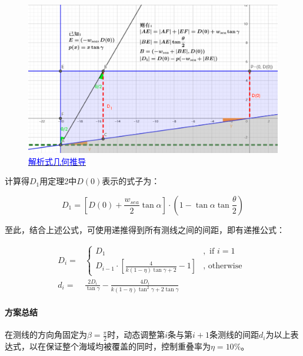 \begin{figure}[h]
    \centering
    \includegraphics[scale=0.3]{res/img/解析式几何推导.png}
    \caption{\href{https://www.geogebra.org/m/ycxg4tw9}{\textcolor{blue}{解析式几何推导}}}
    \label{fig:解析式几何推导}
\end{figure}

计算得$D_1$用定理2中$D(0)$表示的式子为：

\begin{equation}
    D_1 = \left[ D(0) + \frac{w_{sea}}{2} \tan \alpha \right] \cdot \left( 1 - \tan \alpha \tan \frac{\theta}{2} \right)
\end{equation}

至此，结合上述公式，可使用递推得到所有测线之间的间距，即有递推公式：

\begin{align}
    D_{i} = & \begin{cases}
                  D_1                                                                    &, \text{ if } i = 1  \\
                  D_{i - 1} \cdot \left[\frac{4}{k(1 - \eta) \tan \gamma + 2} - 1\right] &, \text{ otherwise }
              \end{cases} \\
    d_i =   & \frac{2D_i}{\tan \gamma} - \frac{4D_i}{k(1-\eta) \tan^2 \gamma + 2 \tan \gamma}
\end{align}

\paragraph{方案总结}

在测线的方向角固定为$\beta = \frac{\pi}{2}$时，动态调整第$i$条与第$i + 1$条测线的间距$d_i$为以上表达式，以在保证整个海域均被覆盖的同时，控制重叠率为$\eta = 10\%$。

